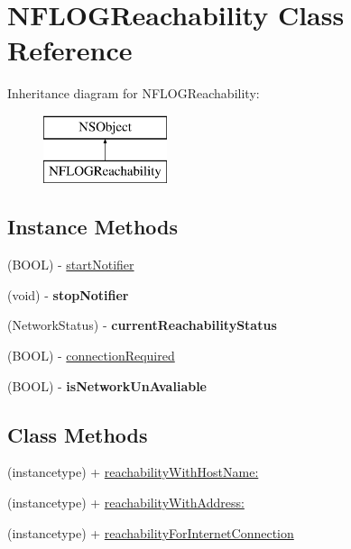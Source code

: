 \hypertarget{interface_n_f_l_o_g_reachability}{}\section{N\+F\+L\+O\+G\+Reachability Class Reference}
\label{interface_n_f_l_o_g_reachability}
Inheritance diagram for N\+F\+L\+O\+G\+Reachability\+:\begin{figure}[H]
\begin{center}
\leavevmode
\includegraphics[height=2.000000cm]{interface_n_f_l_o_g_reachability}
\end{center}
\end{figure}
\subsection*{Instance Methods}
\begin{DoxyCompactItemize}
\item 
(B\+O\+OL) -\/ \hyperlink{interface_n_f_l_o_g_reachability_acebd4e7f3f879e0a609037856ddc89af}{start\+Notifier}
\item 
\mbox{\label{interface_n_f_l_o_g_reachability_a493c666493773e9a84e98d9e6615afbc}} 
(void) -\/ {\bfseries stop\+Notifier}
\item 
\mbox{\label{interface_n_f_l_o_g_reachability_ab242d7a19ec39abb64cf792bb4b21234}} 
(Network\+Status) -\/ {\bfseries current\+Reachability\+Status}
\item 
(B\+O\+OL) -\/ \hyperlink{interface_n_f_l_o_g_reachability_aaec74dc64d3fff3865acfadd47578099}{connection\+Required}
\item 
\mbox{\label{interface_n_f_l_o_g_reachability_a5979dba628e6c19ba9c4f5303d610e44}} 
(B\+O\+OL) -\/ {\bfseries is\+Network\+Un\+Avaliable}
\end{DoxyCompactItemize}
\subsection*{Class Methods}
\begin{DoxyCompactItemize}
\item 
(instancetype) + \hyperlink{interface_n_f_l_o_g_reachability_a78e0d1d8c368aa390026e894860854fb}{reachability\+With\+Host\+Name\+:}
\item 
(instancetype) + \hyperlink{interface_n_f_l_o_g_reachability_abc1eb7b16c3025c3e4f8538f0270ea4e}{reachability\+With\+Address\+:}
\item 
(instancetype) + \hyperlink{interface_n_f_l_o_g_reachability_a58284ef144dc19ec264db24f489f1adb}{reachability\+For\+Internet\+Connection}
\end{DoxyCompactItemize}
